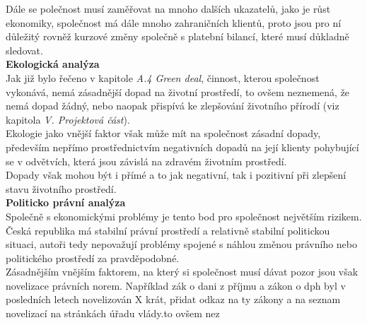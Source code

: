 Dále se polečnost musí zaměřovat na mnoho dalších ukazatelů, jako je růst ekonomiky, společnost má dále mnoho zahraničních klientů, proto jsou pro ní důležitý rovněž kurzové změny společně s platební bilancí, které musí důkladně sledovat.\\




\noindent\textbf{Ekologická analýza}\\

Jak již bylo řečeno v kapitole \textit{A.4 Green deal}, činnost, kterou společnost vykonává, nemá zásadnější dopad na životní prostředí, to ovšem neznemená, že nemá dopad žádný, nebo naopak přispívá ke zlepšování životního přírodí (viz kapitola \textit{V. Projektová část}).\\

Ekologie jako vnější faktor však může mít na společnost zásadní dopady, především nepřímo prostřednictvím negativních dopadů na její klienty pohybující se v odvětvích, která jsou závislá na zdravém životním prostředí.\\

Dopady však mohou být i přímé a to jak negativní, tak i pozitivní při zlepšení stavu životního prostředí.\\

\noindent\textbf{Politicko právní analýza}\\

Společně s ekonomickými problémy je tento bod pro společnost největším rizikem. Česká republika má stabilní právní prostředí a relativně stabilní politickou situaci, autoři tedy nepovažují problémy spojené s náhlou změnou právního nebo politického prostředí za pravděpodobné.\\

Zásadnějším vnějším faktorem, na který si společnost musí dávat pozor jsou však novelizace právních norem. Například zák o dani z příjmu a zákon o dph byl v posledních letech novelizován X krát, přidat odkaz na ty zákony a na seznam novelizací na stránkách úřadu vlády.to ovšem nez\\

